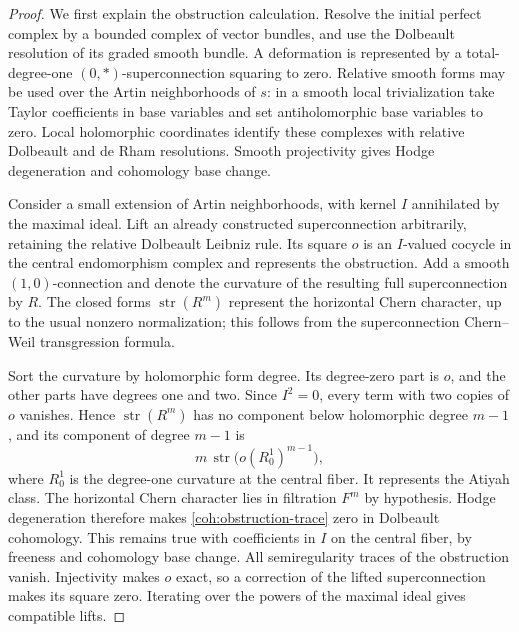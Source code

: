 \documentclass[11pt]{article}
\numberwithin{equation}{section}
\theoremstyle{definition}
\theoremstyle{remark}
\DeclareMathOperator{\str}{str}
\begin{document}
\begin{proof}
We first explain the obstruction calculation.  Resolve the initial
perfect complex by a bounded complex of vector bundles, and use the
Dolbeault resolution of its graded smooth bundle.  A deformation is
represented by a total-degree-one \((0,*)\)-superconnection squaring
to zero.  Relative smooth forms may be used over the Artin
neighborhoods of \(s\): in a smooth local trivialization take Taylor
coefficients in base variables and set antiholomorphic base variables
to zero.  Local holomorphic coordinates identify these complexes with
relative Dolbeault and de Rham resolutions.  Smooth projectivity gives
Hodge degeneration and cohomology base change.

Consider a small extension of Artin neighborhoods, with kernel \(I\)
annihilated by the maximal ideal.  Lift an already constructed
superconnection arbitrarily, retaining the relative Dolbeault Leibniz
rule.  Its square \(o\) is an \(I\)-valued cocycle in the central
endomorphism complex and represents the obstruction.  Add a smooth
\((1,0)\)-connection and denote the curvature of the resulting full
superconnection by \(R\).  The closed forms \(\str(R^m)\) represent
the horizontal Chern character, up to the usual nonzero normalization;
this follows from the superconnection Chern--Weil transgression
formula.

Sort the curvature by holomorphic form degree.  Its degree-zero part
is \(o\), and the other parts have degrees one and two.  Since
\(I^2=0\), every term with two copies of \(o\) vanishes.  Hence
\(\str(R^m)\) has no component below holomorphic degree \(m-1\),
and its component of degree \(m-1\) is
\begin{equation}\label{coh:obstruction-trace}
 m\,\str\bigl(o(R^1_0)^{m-1}\bigr),
\end{equation}
where \(R^1_0\) is the degree-one curvature at the central fiber.
It represents the Atiyah class.  The horizontal Chern character lies
in filtration \(F^m\) by hypothesis.  Hodge degeneration therefore
makes \eqref{coh:obstruction-trace} zero in Dolbeault cohomology.
This remains true with coefficients in \(I\) on the central fiber,
by freeness and cohomology base change.  All semiregularity traces of
the obstruction vanish.  Injectivity makes \(o\) exact, so a
correction of the lifted superconnection makes its square zero.
Iterating over the powers of the maximal ideal gives compatible lifts.


\end{proof}
\end{document}
